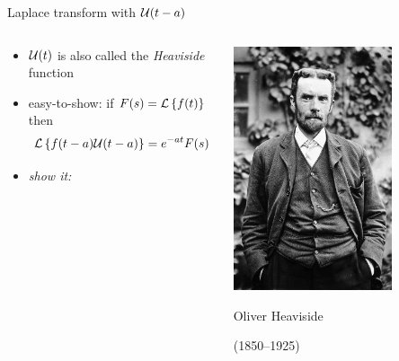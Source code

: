 \documentclass[dvipsnames,colorlinks]{beamer}
\begin{document}
\begin{frame}{Laplace transform with $\mathcal{U}(t-a)$}

\begin{columns}
\begin{column}{0.8\textwidth}
\begin{itemize}
\item $\mathcal{U}(t)$ is also called the \emph{Heaviside} function
\item easy-to-show: if $F(s)=\mathcal{L}\left\{f(t)\right\}$ then
    $$\mathcal{L}\left\{f(t-a)\mathcal{U}(t-a)\right\} = e^{-at} F(s)$$

\item \emph{show it:}

\vspace{40mm}
\end{itemize}
\end{column}
\begin{column}{0.2\textwidth}
\vspace{3mm}

\includegraphics[width=0.7\textwidth]{figs/Heaviside}

\tiny
Oliver Heaviside

(1850--1925)


\end{column}
\end{columns}
\end{frame}
\end{document}
